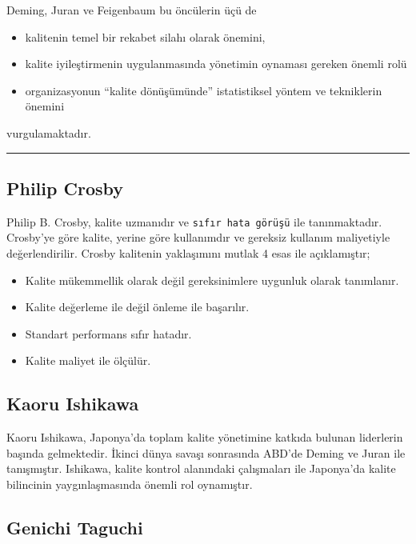 \documentclass[
]{book}
\providecommand{\tightlist}{%
  \setlength{\itemsep}{0pt}\setlength{\parskip}{0pt}}
\begin{document}
Deming, Juran ve Feigenbaum bu öncülerin üçü de

\begin{itemize}
\tightlist
\item
  kalitenin temel bir rekabet silahı olarak önemini,
\item
  kalite iyileştirmenin uygulanmasında yönetimin oynaması gereken önemli rolü
\item
  organizasyonun ``kalite dönüşümünde'' istatistiksel yöntem ve tekniklerin önemini
\end{itemize}

vurgulamaktadır.

\begin{center}\rule{0.5\linewidth}{0.5pt}\end{center}

\hypertarget{philip-crosby}{%
\subsection{Philip Crosby}\label{philip-crosby}}

Philip B. Crosby, kalite uzmanıdır ve \texttt{sıfır\ hata\ görüşü} ile tanınmaktadır. Crosby'ye göre kalite, yerine göre kullanımdır ve gereksiz kullanım maliyetiyle değerlendirilir. Crosby kalitenin yaklaşımını mutlak 4 esas ile açıklamıştır;

\begin{itemize}
\item
  Kalite mükemmellik olarak değil gereksinimlere uygunluk olarak tanımlanır.
\item
  Kalite değerleme ile değil önleme ile başarılır.
\item
  Standart performans sıfır hatadır.
\item
  Kalite maliyet ile ölçülür.
\end{itemize}

\hypertarget{kaoru-ishikawa}{%
\subsection{Kaoru Ishikawa}\label{kaoru-ishikawa}}

Kaoru Ishikawa, Japonya'da toplam kalite yönetimine katkıda bulunan liderlerin başında gelmektedir. İkinci dünya savaşı sonrasında ABD'de Deming ve Juran ile tanışmıştır. Ishikawa, kalite kontrol alanındaki çalışmaları ile Japonya'da kalite bilincinin yaygınlaşmasında önemli rol oynamıştır.

\hypertarget{genichi-taguchi}{%
\subsection{Genichi Taguchi}\label{genichi-taguchi}}
\end{document}
